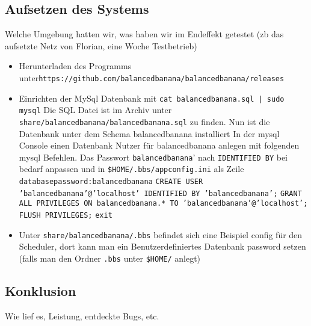 \documentclass[a4paper,12pt]{article}
\begin{document}
\subsection{Aufsetzen des Systems}
\vspace{0.2cm}
Welche Umgebung hatten wir, was haben wir im Endeffekt getestet (zb das aufsetzte Netz von Florian, eine Woche Testbetrieb)
\begin{itemize}[label={\textbullet}]
    \item Herunterladen des Programms unter\newline \texttt{https://github.com/balancedbanana/balancedbanana/releases}
    \item Einrichten der MySql Datenbank mit \texttt{cat balancedbanana.sql | sudo mysql}\newline
          Die SQL Datei ist im Archiv unter \texttt{share/balancedbanana/balancedbanana.sql} zu finden.\newline
          Nun ist die Datenbank unter dem Schema balancedbanana installiert
          In der mysql Console einen Datenbank Nutzer für balancedbanana anlegen mit folgenden mysql Befehlen. Das Passwort \texttt{balancedbanana}' nach \texttt{IDENTIFIED BY} bei bedarf anpassen und in \texttt{\$HOME/.bbs/appconfig.ini} als Zeile \texttt{databasepassword:balancedbanana}\newline
          \texttt{CREATE USER 'balancedbanana'@'localhost' IDENTIFIED BY 'balancedbanana';}\newline
          \texttt{GRANT ALL PRIVILEGES ON balancedbanana.* TO 'balancedbanana'@'localhost';}\newline
          \texttt{FLUSH PRIVILEGES;}\newline
          \texttt{exit}
    \item Unter \texttt{share/balancedbanana/.bbs} befindet sich eine Beispiel config für den Scheduler, dort kann man ein Benutzerdefiniertes Datenbank password setzen (falls man den Ordner \texttt{.bbs} unter \texttt{\$HOME/} anlegt)

\end{itemize}
\subsection{Konklusion}
Wie lief es, Leistung, entdeckte Bugs, etc.
\clearpage
\end{document}
